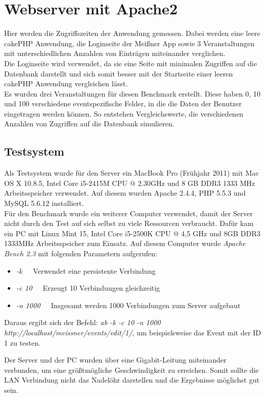\section{Webserver mit Apache2}
Hier werden die Zugriffszeiten der Anwendung gemessen. Dabei werden eine leere cakePHP Anwendung, die Loginseite der Meißner App sowie 3 Veranstaltungen mit unterschiedlichen Anzahlen von Einträgen miteinander verglichen.\\
Die Loginseite wird verwendet, da sie eine Seite mit minimalen Zugriffen auf die Datenbank darstellt und sich somit besser mit der Startseite einer leeren cakePHP Anwendung vergleichen lässt.\\
Es wurden drei Veranstaltungen für diesen Benchmark erstellt. Diese haben 0, 10 und 100 verschiedene eventspezifische Felder, in die die Daten der Benutzer eingetragen werden können. So entstehen Vergleichswerte, die verschiedenen Anzahlen von Zugriffen auf die Datenbank simulieren.

\subsection{Testsystem}
Als Testsystem wurde für den Server ein MacBook Pro (Frühjahr 2011) mit Mac OS X 10.8.5, Intel Core i5-2415M CPU @ 2.30GHz und 8 GB DDR3 1333 MHz Arbeitsspeicher verwendet. Auf diesem wurden Apache 2.4.4, PHP 5.5.3 und MySQL 5.6.12 installiert.\\
Für den Benchmark wurde ein weiterer Computer verwendet, damit der Server nicht durch den Test auf sich selbst zu viele Ressourcen verbraucht. Dafür kam ein PC mit Linux Mint 15, Intel Core i5-2500K CPU @ 4,5 GHz und 8GB DDR3 1333MHz Arbeitsspeicher zum Einsatz. Auf diesem Computer wurde \emph{Apache Bench 2.3} mit folgenden Parametern aufgerufen:

\begin{itemize}
	\item[] \emph{-k}\ \ \ Verwendet eine persistente Verbindung
	\item[] \emph{-c 10}\ \ \ Erzeugt 10 Verbindungen gleichzeitig
	\item[] \emph{-n 1000}\ \ \ Insgesamt werden 1000 Verbindungen zum Server aufgebaut
\end{itemize}

Daraus ergibt sich der Befehl: \emph{ab -k -c 10 -n 1000 http://localhost/meissner/events/edit/1/}, um beispielsweise das Event mit der ID 1 zu testen.\par

Der Server und der PC wurden über eine Gigabit-Leitung miteinander verbunden, um eine größtmögliche Geschwindigkeit zu erreichen. Somit sollte die LAN Verbindung nicht das Nadelöhr darstellen und die Ergebnisse möglichst gut sein.

